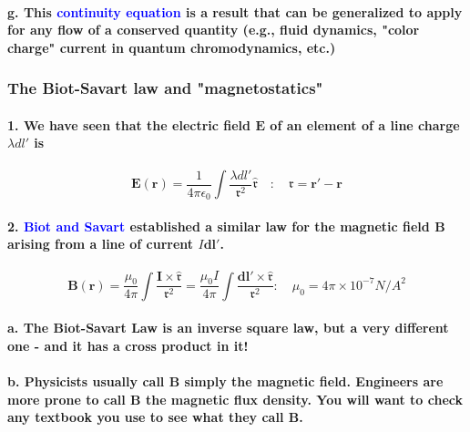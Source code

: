 \documentclass{article}
\begin{document}
\paragraph{\indent g. This \textcolor{blue}{continuity equation} is a result that can be generalized to apply for any flow of a conserved quantity (e.g., fluid dynamics, "color charge" current in quantum chromodynamics, etc.)}
\subsubsection{The Biot-Savart law and "magnetostatics"}
\paragraph{1. We have seen that the electric field $\boldsymbol{E}$ of an element of a line charge $\lambda dl'$ is}
\begin{equation*}
    \boldsymbol{E}(\boldsymbol{r})=\frac{1}{4\pi\epsilon_0}\int\frac{\lambda dl'}{\mathfrak{r}^2}\hat{\boldsymbol{\mathfrak{r}}}\quad:\quad \boldsymbol{\mathfrak{r}}=\boldsymbol{r}'-\boldsymbol{r}
\end{equation*}
\paragraph{2. \textcolor{blue}{Biot and Savart} established a similar law for the magnetic field $\boldsymbol{B}$ arising from a line of current $I\boldsymbol{dl}'$.}
\begin{equation*}
    \boldsymbol{B}(\boldsymbol{r})=\frac{\mu_0}{4\pi}\int\frac{\boldsymbol{I}\times\hat{\boldsymbol{\mathfrak{r}}}}{\mathfrak{r}^2}=\frac{\mu_0 I}{4\pi}\int\frac{\boldsymbol{dl}'\times\hat{\boldsymbol{\mathfrak{r}}}}{\mathfrak{r}^2}:\quad \mu_0=4\pi\times 10^{-7}N/A^2
\end{equation*}
\paragraph{\indent a. The Biot-Savart Law is an inverse square law, but a very different one - and it has a cross product in it!}
\paragraph{\indent b. Physicists usually call $\boldsymbol{B}$ simply the magnetic field. Engineers are more prone to call $\boldsymbol{B}$ the magnetic flux density. You will want to check any textbook you use to see what they call $\boldsymbol{B}$.}
\end{document}
